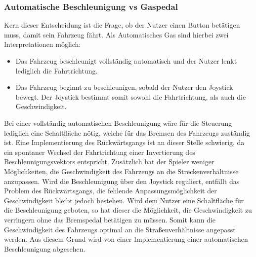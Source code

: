	\subsubsection{Automatische Beschleunigung vs Gaspedal}
	Kern dieser Entscheidung ist die Frage, ob der Nutzer einen Button betätigen muss, damit sein Fahrzeug fährt. Als Automatisches Gas sind hierbei zwei Interpretationen möglich:
	\begin{itemize}
	\item{ Das Fahrzeug beschleunigt vollständig automatisch und der Nutzer lenkt lediglich die Fahrtrichtung.}
	\item{ Das Fahrzeug beginnt zu beschleunigen, sobald der Nutzer den Joystick bewegt. Der Joystick bestimmt somit sowohl die Fahrtrichtung, als auch die Geschwindigkeit.}
	\end{itemize}
	Bei einer vollständig automatischen Beschleunigung wäre für die Steuerung lediglich eine Schaltfläche nötig, welche für das Bremsen des Fahrzeugs zuständig ist. Eine Implementierung des Rückwärtsgangs ist an dieser Stelle schwierig, da ein spontaner Wechsel der Fahrtrichtung einer Invertierung des Beschleunigungsvektors entspricht. Zusätzlich hat der Spieler weniger Möglichkeiten, die Geschwindigkeit des Fahrzeugs an die Streckenverhältnisse anzupassen. Wird die Beschleunigung über den Joystick reguliert, entfällt das Problem des Rückwärtsgangs, die fehlende Anpassungsmöglichkeit der Geschwindigkeit bleibt jedoch bestehen.
	Wird dem Nutzer eine Schaltfläche für die Beschleunigung geboten, so hat dieser die Möglichkeit, die Geschwindigkeit zu verringern ohne das Bremspedal betätigen zu müssen. Somit kann die Geschwindigkeit des Fahrzeugs optimal an die Straßenverhältnisse angepasst werden. Aus diesem Grund wird von einer Implementierung einer automatischen Beschleunigung abgesehen.

